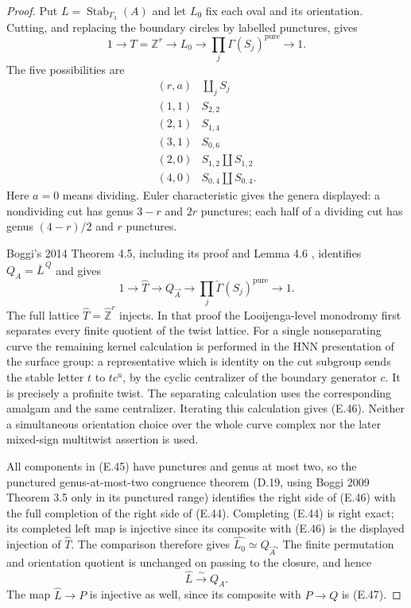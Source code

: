 \begin{proof}
Put $L=\operatorname{Stab}_{\Gamma_3}(A)$ and let $L_0$
fix each oval and its orientation.  Cutting, and replacing
the boundary circles by labelled punctures, gives
\[
 1\longrightarrow T=\mathbb Z^r\longrightarrow L_0
    \longrightarrow\prod_j\Gamma(S_j)^{\mathrm{pure}}
    \longrightarrow1.                                        \tag{E.44}
\]
The five possibilities are
\[
\begin{array}{c|c}
(r,a)&\coprod_j S_j\\\hline
(1,1)&S_{2,2}\\
(2,1)&S_{1,4}\\
(3,1)&S_{0,6}\\
(2,0)&S_{1,2}\amalg S_{1,2}\\
(4,0)&S_{0,4}\amalg S_{0,4}.
\end{array}                                                    \tag{E.45}
\]
Here $a=0$ means dividing.  Euler characteristic gives the
genera displayed: a nondividing cut has genus $3-r$ and
$2r$ punctures; each half of a dividing cut has genus
$(4-r)/2$ and $r$ punctures.

Boggi's 2014 Theorem 4.5, including its proof and Lemma 4.6
\cite{ET_Boggi2014}, identifies
$Q_A=\overline L^{\,Q}$ and gives
\[
 1\longrightarrow\widehat T\longrightarrow Q_{\vec A}
 \longrightarrow\prod_j\check\Gamma(S_j)^{\mathrm{pure}}
 \longrightarrow1.                                           \tag{E.46}
\]
The full lattice $\widehat T=\widehat{\mathbb Z}^r$ injects.
In that proof the Looijenga-level monodromy first separates
every finite quotient of the twist lattice.  For a single
nonseparating curve the remaining kernel calculation is
performed in the HNN presentation of the surface group:
a representative which is identity on the cut subgroup sends
the stable letter $t$ to $t c^u$, by the cyclic centralizer
of the boundary generator $c$.  It is precisely a profinite
twist.  The separating calculation uses the corresponding
amalgam and the same centralizer.  Iterating this calculation
gives (E.46).  Neither a simultaneous orientation choice over
the whole curve complex nor the later mixed-sign multitwist
assertion is used.

All components in (E.45) have punctures and genus at most
two, so the punctured genus-at-most-two congruence theorem
(D.19, using Boggi 2009 Theorem 3.5 only in its punctured range)
identifies the right side of (E.46) with the full completion
of the right side of (E.44).  Completing (E.44) is right
exact; its completed left map is injective since its composite
with (E.46) is the displayed injection of $\widehat T$.
The comparison therefore gives
$\widehat{L_0}\simeq Q_{\vec A}$.  The finite permutation
and orientation quotient is unchanged on passing to the
closure, and hence
\[
 \widehat L\xrightarrow{\sim}Q_A.                            \tag{E.47}
\]
The map $\widehat L\to P$ is injective as well, since its
composite with $P\to Q$ is (E.47).


\end{proof}
